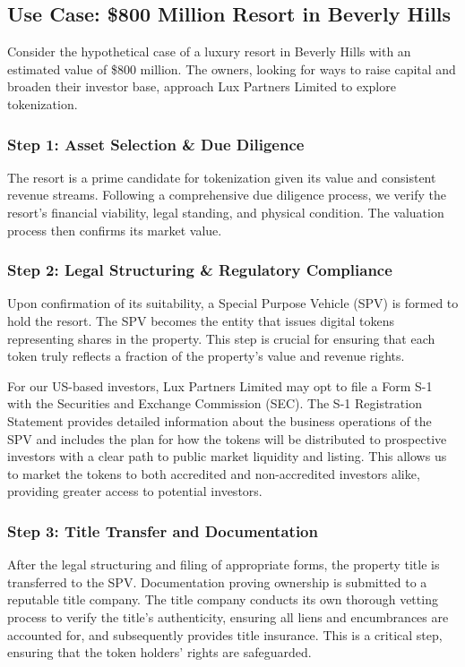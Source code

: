 \documentclass[11pt]{article}
\begin{document}
\subsection{Use Case: \$800 Million Resort in Beverly Hills}

Consider the hypothetical case of a luxury resort in Beverly Hills with an estimated value of \$800 million. The owners, looking for ways to raise capital and broaden their investor base, approach Lux Partners Limited to explore tokenization.


\subsubsection{Step 1: Asset Selection \& Due Diligence}

The resort is a prime candidate for tokenization given its value and consistent revenue streams. Following a comprehensive due diligence process, we verify the resort's financial viability, legal standing, and physical condition. The valuation process then confirms its market value.


\subsubsection{Step 2: Legal Structuring \& Regulatory Compliance}

Upon confirmation of its suitability, a Special Purpose Vehicle (SPV) is formed to hold the resort. The SPV becomes the entity that issues digital tokens representing shares in the property. This step is crucial for ensuring that each token truly reflects a fraction of the property's value and revenue rights.


For our US-based investors, Lux Partners Limited may opt to file a Form S-1 with the Securities and Exchange Commission (SEC). The S-1 Registration Statement provides detailed information about the business operations of the SPV and includes the plan for how the tokens will be distributed to prospective investors with a clear path to public market liquidity and listing. This allows us to market the tokens to both accredited and non-accredited investors alike, providing greater access to potential investors.


\subsubsection{Step 3: Title Transfer and Documentation}

After the legal structuring and filing of appropriate forms, the property title is transferred to the SPV. Documentation proving ownership is submitted to a reputable title company. The title company conducts its own thorough vetting process to verify the title's authenticity, ensuring all liens and encumbrances are accounted for, and subsequently provides title insurance. This is a critical step, ensuring that the token holders' rights are safeguarded.
\end{document}
